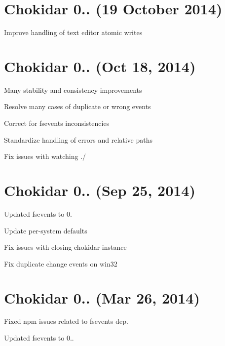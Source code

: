 \section*{Chokidar 0.. (19 October 2014)}


\begin{DoxyItemize}
\item Improve handling of text editor atomic writes
\end{DoxyItemize}

\section*{Chokidar 0.. (Oct 18, 2014)}


\begin{DoxyItemize}
\item Many stability and consistency improvements
\item Resolve many cases of duplicate or wrong events
\item Correct for fsevents inconsistencies
\item Standardize handling of errors and relative paths
\item Fix issues with watching {\ttfamily ./}
\end{DoxyItemize}

\section*{Chokidar 0.. (Sep 25, 2014)}


\begin{DoxyItemize}
\item Updated fsevents to 0.
\item Update per-\/system defaults
\item Fix issues with closing chokidar instance
\item Fix duplicate change events on win32
\end{DoxyItemize}

\section*{Chokidar 0.. (Mar 26, 2014)}


\begin{DoxyItemize}
\item Fixed npm issues related to fsevents dep.
\item Updated fsevents to 0..
\end{DoxyItemize}

